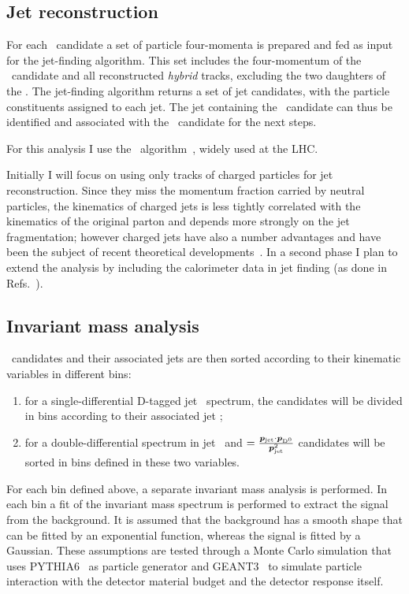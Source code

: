\documentclass[a4paper]{jpconf}
\begin{document}
\subsection{Jet reconstruction}
For each \Dzero\ candidate a set of particle four-momenta is prepared and fed as input for the jet-finding algorithm.
This set includes the four-momentum of the \Dzero\ candidate and all reconstructed \emph{hybrid} tracks,
excluding the two daughters of the \Dzero. The jet-finding algorithm returns a set of jet candidates, with the particle constituents
assigned to each jet. The jet containing the \Dzero\ candidate can thus be identified and associated with the \Dzero\ candidate for the next steps.

For this analysis I use the \antikt\ algorithm~\cite{Cacciari:2008c}, widely used at the LHC.

Initially I will focus on using only tracks of charged particles for jet reconstruction. Since they miss the momentum
fraction carried by neutral particles, the kinematics of charged jets is less tightly correlated with the kinematics
of the original parton and depends more strongly on the jet fragmentation; however charged jets have also a number advantages
and have been the subject of recent theoretical developments~\cite{Thaler:2013}.
In a second phase I plan to extend the analysis by including the calorimeter data in jet finding (as done in Refs.~\cite{ALICE:2013c, ALICE:2015a}).

\subsection{Invariant mass analysis}
\Dzero\ candidates and their associated jets are then sorted according to their kinematic variables in different bins:
\begin{enumerate}
\item for a single-differential D-tagged jet \pT\ spectrum, the candidates will be divided in bins according to their associated jet \pT;
\item for a double-differential spectrum in jet \pT\ and \zpar$=\frac{\bm{p}_{\rm jet}\cdot{\bm{p}}_{\rm D^0}}{\bm{p}_{\rm jet}^2}$ candidates will
be sorted in bins defined in these two variables.
\end{enumerate}
For each bin defined above, a separate invariant mass analysis is performed. 
In each bin a fit of the invariant mass spectrum is performed to extract the signal from the background. It is assumed that the background has
a smooth shape that can be fitted by an exponential function, whereas the signal is fitted by a Gaussian. These assumptions are tested
through a Monte Carlo simulation that uses PYTHIA6~\cite{Sjostrand:2006} as particle generator and GEANT3~\cite{GEANT3-url} to simulate particle interaction
with the detector material budget and the detector response itself.
\end{document}
